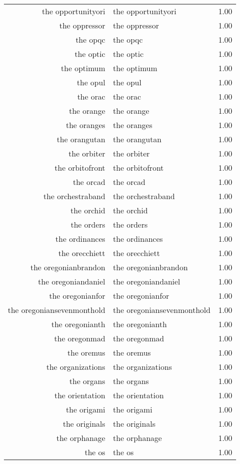 \begin{table}[ht]
\begin{tabular}{rlr}
  the opportunityori & the opportunityori & 1.00 \\ 
  the oppressor & the oppressor & 1.00 \\ 
  the opqc & the opqc & 1.00 \\ 
  the optic & the optic & 1.00 \\ 
  the optimum & the optimum & 1.00 \\ 
  the opul & the opul & 1.00 \\ 
  the orac & the orac & 1.00 \\ 
  the orange & the orange & 1.00 \\ 
  the oranges & the oranges & 1.00 \\ 
  the orangutan & the orangutan & 1.00 \\ 
  the orbiter & the orbiter & 1.00 \\ 
  the orbitofront & the orbitofront & 1.00 \\ 
  the orcad & the orcad & 1.00 \\ 
  the orchestraband & the orchestraband & 1.00 \\ 
  the orchid & the orchid & 1.00 \\ 
  the orders & the orders & 1.00 \\ 
  the ordinances & the ordinances & 1.00 \\ 
  the orecchiett & the orecchiett & 1.00 \\ 
  the oregonianbrandon & the oregonianbrandon & 1.00 \\ 
  the oregoniandaniel & the oregoniandaniel & 1.00 \\ 
  the oregonianfor & the oregonianfor & 1.00 \\ 
  the oregoniansevenmonthold & the oregoniansevenmonthold & 1.00 \\ 
  the oregonianth & the oregonianth & 1.00 \\ 
  the oregonmad & the oregonmad & 1.00 \\ 
  the oremus & the oremus & 1.00 \\ 
  the organizations & the organizations & 1.00 \\ 
  the organs & the organs & 1.00 \\ 
  the orientation & the orientation & 1.00 \\ 
  the origami & the origami & 1.00 \\ 
  the originals & the originals & 1.00 \\ 
  the orphanage & the orphanage & 1.00 \\ 
  the os & the os & 1.00 \\ 

\end{tabular}
\end{table}
